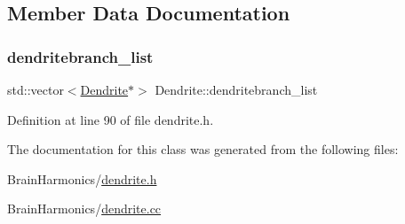 \subsection{Member Data Documentation}
\mbox{\label{class_dendrite_a1d57708bfa57443d3fa0358984b4c761}} 
\subsubsection{\texorpdfstring{dendritebranch\+\_\+list}{dendritebranch\_list}}
{\footnotesize\ttfamily std\+::vector$<$\mbox{\hyperlink{class_dendrite}{Dendrite}}$\ast$$>$ Dendrite\+::dendritebranch\+\_\+list\hspace{0.3cm}{\ttfamily [protected]}}



Definition at line 90 of file dendrite.\+h.



The documentation for this class was generated from the following files\+:\begin{DoxyCompactItemize}
\item 
Brain\+Harmonics/\mbox{\hyperlink{dendrite_8h}{dendrite.\+h}}\item 
Brain\+Harmonics/\mbox{\hyperlink{dendrite_8cc}{dendrite.\+cc}}\end{DoxyCompactItemize}
